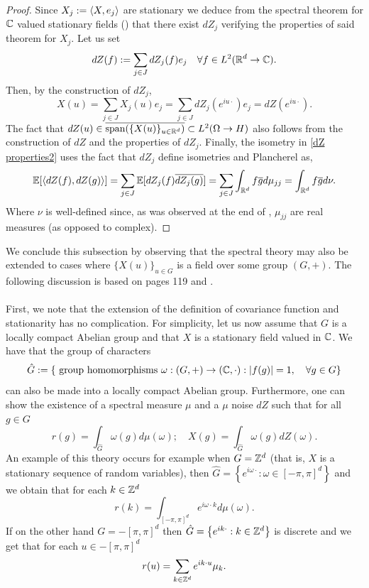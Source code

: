 \documentclass[
    a4paper,
    DIV=14,
    abstract=true,
    numbers=noenddot
]{scrartcl}
\begin{document}
\begin{proof}
	Since $X_j:=\left\langle X,e_j\right\rangle$ are stationary we deduce from the spectral theorem for $\mathbb{C}$ valued stationary fields () that there exist $dZ_j$ verifying the properties of said theorem for $X_j$. Let us set
	\begin{equation*}
		dZ(f):=\sum_{j\in J}dZ_j(f)e_j\quad\forall f\in L^2(\mathbb{R}^d\to\mathbb{C}).
	\end{equation*}
	Then, by the construction of $dZ_j$,
	\begin{equation*}
		X(u)=\sum_{j\in J}X_j(u) e_j=\sum_{j\in J}dZ_j(e^{iu\cdot})e_j=dZ(e^{iu\cdot}).
	\end{equation*}
	The fact that $dZ(u)\in \overline{\text{span}(\{X(u)\}_{u\in\mathbb{R}^d})}\subset L^2(\Omega\to H)$ also follows from the construction of $dZ$ and the properties of $dZ_j$. Finally, the isometry in \eqref{dZ properties2} uses the fact that $dZ_j$ define isometries and Plancherel as,
	\begin{equation*}
		\mathbb{E}[\left\langle dZ(f),{dZ(g)}\right\rangle]=\sum_{j\in J}\mathbb{E}[dZ_j(f)\overline{dZ_j(g)}]=\sum_{j\in J}\int_{\mathbb{R}^d}f\overline{g} d\mu_{jj}=\int_{\mathbb{R}^d}f\overline{g} d\nu.
	\end{equation*}
	Where $\nu$ is well-defined since, as was observed at the end of , $\mu_{jj}$ are real measures (as opposed to complex).
\end{proof}
We conclude this subsection by observing that the spectral theory may also be extended to cases where $\{X(u)\}_{u\in G}$ is a field over some group $(G,+)$. The following discussion is based on \cite{adler2007random} pages 119 and \cite{yaglom1961second}. \\
\\
First, we note that the extension of the definition of covariance function and stationarity has no complication. For simplicity, let us now assume that $G$ is a locally compact Abelian group and that $X$ is a stationary field valued in $\mathbb{C}$. We have that the group of characters
$$\hat{G}:=\{\text{ group homomorphisms } \omega:(G,+)\to(\mathbb{C},\cdot): \left| f(g) \right|=1,\quad\forall g\in G\}$$ can also be made into a locally compact Abelian group. Furthermore, one can show the existence of a spectral measure $\mu$ and a $\mu$ noise $dZ$ such that for all $g\in G$
\begin{equation*}
	r(g)=\int_{\hat{G}}\omega(g)d\mu(\omega);\quad X(g)=\int_{\hat{G}}\omega(g)dZ(\omega).
\end{equation*}
An example of this theory occurs for example when $G=\mathbb{Z}^d$ (that is, $X$ is a stationary sequence of random variables), then
$
	\hat{G}=\left\{e^{i\omega \cdot}:\omega\in[-\pi,\pi]^d\right\}
$
and we obtain that for each $k\in\mathbb{Z}^d$
\begin{equation*}
	r(k)=\int_{[-\pi,\pi]^d}e^{i\omega \cdot k}d\mu(\omega).
\end{equation*}
If on the other hand $G=-[\pi,\pi]^d$ then $
	\hat{G}=\left\{e^{ik \cdot}:k\in\mathbb{Z}^d\right\}
$ is discrete
and we get that for each $u\in-[\pi,\pi]^d $
\begin{equation*}
	r(u)=\sum_{k\in\mathbb{Z}^d}e^{ik \cdot u}\mu_k.
\end{equation*}
\end{document}

